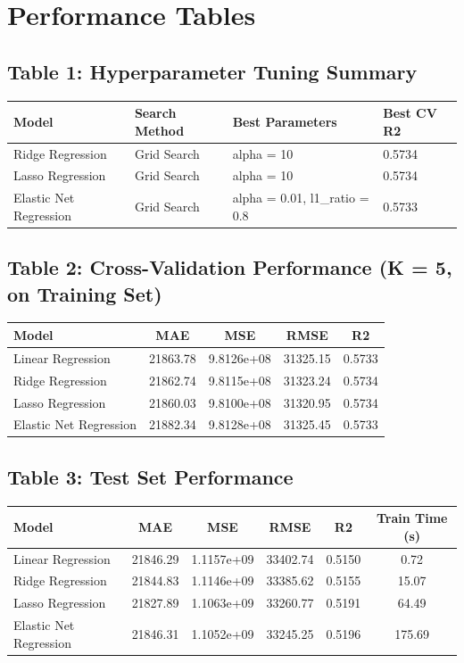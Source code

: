\documentclass[12pt,a4paper]{article}
\begin{document}
\section{Performance Tables}

\subsection*{Table 1: Hyperparameter Tuning Summary}
\begin{tabular}{|p{3.3cm}|p{2.6cm}|p{5cm}|p{1.8cm}|}
\hline
Model & Search Method & Best Parameters & Best CV R2 \\ \hline
Ridge Regression & Grid Search & alpha = 10 & 0.5734 \\ \hline
Lasso Regression & Grid Search & alpha = 10 & 0.5734 \\ \hline
Elastic Net Regression & Grid Search & alpha = 0.01, l1\_ratio = 0.8 & 0.5733 \\ \hline
\end{tabular}

\subsection*{Table 2: Cross-Validation Performance (K = 5, on Training Set)}
\begin{tabular}{lcccc}
\toprule
Model & MAE & MSE & RMSE & R2 \\
\midrule
Linear Regression & 21863.78 & 9.8126e+08 & 31325.15 & 0.5733 \\
Ridge Regression & 21862.74 & 9.8115e+08 & 31323.24 & 0.5734 \\
Lasso Regression & 21860.03 & 9.8100e+08 & 31320.95 & 0.5734 \\
Elastic Net Regression & 21882.34 & 9.8128e+08 & 31325.45 & 0.5733 \\
\bottomrule
\end{tabular}

\subsection*{Table 3: Test Set Performance}
\begin{tabular}{lccccc}
\toprule
Model & MAE & MSE & RMSE & R2 & Train Time (s) \\
\midrule
Linear Regression & 21846.29 & 1.1157e+09 & 33402.74 & 0.5150 & 0.72 \\
Ridge Regression & 21844.83 & 1.1146e+09 & 33385.62 & 0.5155 & 15.07 \\
Lasso Regression & 21827.89 & 1.1063e+09 & 33260.77 & 0.5191 & 64.49 \\
Elastic Net Regression & 21846.31 & 1.1052e+09 & 33245.25 & 0.5196 & 175.69 \\
\bottomrule
\end{tabular}
\end{document}
